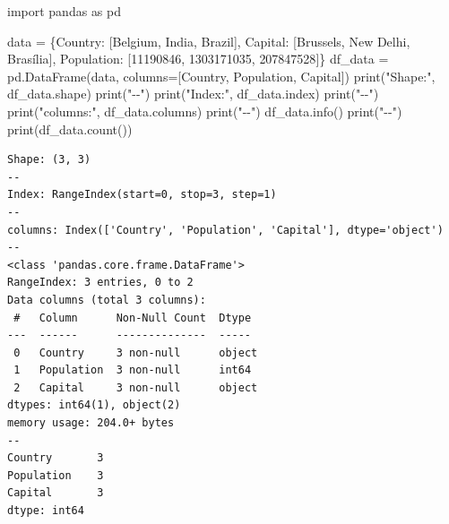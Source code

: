 \documentclass[
  polish,
  letterpaper,
  DIV=11,
  numbers=noendperiod]{scrreprt}
\newenvironment{Shaded}{\begin{snugshade}}{\end{snugshade}}
\newcommand{\BuiltInTok}[1]{\textcolor[rgb]{0.00,0.23,0.31}{#1}}
\newcommand{\DecValTok}[1]{\textcolor[rgb]{0.68,0.00,0.00}{#1}}
\newcommand{\ImportTok}[1]{\textcolor[rgb]{0.00,0.46,0.62}{#1}}
\newcommand{\NormalTok}[1]{\textcolor[rgb]{0.00,0.23,0.31}{#1}}
\newcommand{\OperatorTok}[1]{\textcolor[rgb]{0.37,0.37,0.37}{#1}}
\newcommand{\StringTok}[1]{\textcolor[rgb]{0.13,0.47,0.30}{#1}}
\begin{document}
\begin{Shaded}
\begin{Highlighting}[]
\ImportTok{import}\NormalTok{ pandas }\ImportTok{as}\NormalTok{ pd}

\NormalTok{data }\OperatorTok{=}\NormalTok{ \{}\StringTok{\textquotesingle{}Country\textquotesingle{}}\NormalTok{: [}\StringTok{\textquotesingle{}Belgium\textquotesingle{}}\NormalTok{, }\StringTok{\textquotesingle{}India\textquotesingle{}}\NormalTok{, }\StringTok{\textquotesingle{}Brazil\textquotesingle{}}\NormalTok{],}
        \StringTok{\textquotesingle{}Capital\textquotesingle{}}\NormalTok{: [}\StringTok{\textquotesingle{}Brussels\textquotesingle{}}\NormalTok{, }\StringTok{\textquotesingle{}New Delhi\textquotesingle{}}\NormalTok{, }\StringTok{\textquotesingle{}Brasília\textquotesingle{}}\NormalTok{],}
        \StringTok{\textquotesingle{}Population\textquotesingle{}}\NormalTok{: [}\DecValTok{11190846}\NormalTok{, }\DecValTok{1303171035}\NormalTok{, }\DecValTok{207847528}\NormalTok{]\}}
\NormalTok{df\_data }\OperatorTok{=}\NormalTok{ pd.DataFrame(data, columns}\OperatorTok{=}\NormalTok{[}\StringTok{\textquotesingle{}Country\textquotesingle{}}\NormalTok{, }\StringTok{\textquotesingle{}Population\textquotesingle{}}\NormalTok{, }\StringTok{\textquotesingle{}Capital\textquotesingle{}}\NormalTok{])}
\BuiltInTok{print}\NormalTok{(}\StringTok{"Shape:"}\NormalTok{, df\_data.shape)}
\BuiltInTok{print}\NormalTok{(}\StringTok{"{-}{-}"}\NormalTok{)}
\BuiltInTok{print}\NormalTok{(}\StringTok{"Index:"}\NormalTok{, df\_data.index)}
\BuiltInTok{print}\NormalTok{(}\StringTok{"{-}{-}"}\NormalTok{)}
\BuiltInTok{print}\NormalTok{(}\StringTok{"columns:"}\NormalTok{, df\_data.columns)}
\BuiltInTok{print}\NormalTok{(}\StringTok{"{-}{-}"}\NormalTok{)}
\NormalTok{df\_data.info()}
\BuiltInTok{print}\NormalTok{(}\StringTok{"{-}{-}"}\NormalTok{)}
\BuiltInTok{print}\NormalTok{(df\_data.count())}
\end{Highlighting}
\end{Shaded}

\begin{verbatim}
Shape: (3, 3)
--
Index: RangeIndex(start=0, stop=3, step=1)
--
columns: Index(['Country', 'Population', 'Capital'], dtype='object')
--
<class 'pandas.core.frame.DataFrame'>
RangeIndex: 3 entries, 0 to 2
Data columns (total 3 columns):
 #   Column      Non-Null Count  Dtype 
---  ------      --------------  ----- 
 0   Country     3 non-null      object
 1   Population  3 non-null      int64 
 2   Capital     3 non-null      object
dtypes: int64(1), object(2)
memory usage: 204.0+ bytes
--
Country       3
Population    3
Capital       3
dtype: int64
\end{verbatim}
\end{document}
